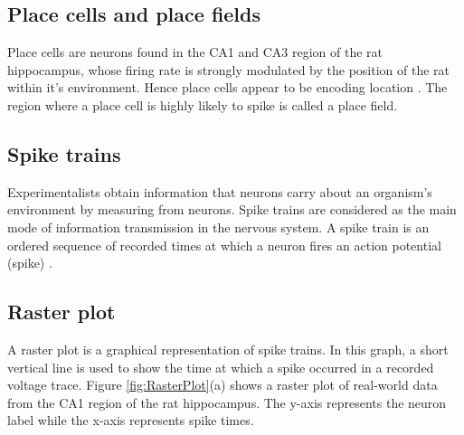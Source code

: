\subsection{Place cells and place fields}
Place cells are neurons found in the CA1 and CA3 region of the rat hippocampus,
whose firing rate is strongly modulated by the position of the rat within it's
environment. Hence place cells appear to be encoding location \cite{OKeefe1971, OKeefe1978}. The region where a place cell is highly likely to spike is called a place field.

\subsection{Spike trains} 
Experimentalists obtain information that neurons carry about an organism's
environment by measuring from neurons. Spike trains are considered as the 
main mode of information transmission in the nervous system. 
A spike train is an ordered sequence of recorded times at which a neuron
fires an action potential (spike) \cite{Dayan2001}.


\subsection{Raster plot}
A raster plot is a graphical representation of spike trains. In this graph,
a short vertical line is used to show the time at which a spike occurred
in a recorded voltage trace. Figure \ref{fig:RasterPlot}(a) shows a raster plot of real-world data
from the CA1 region of the rat hippocampus. The y-axis represents the neuron
label while the x-axis represents spike times.\\

